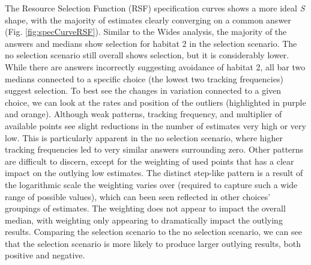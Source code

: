 \documentclass[10pt,a4paper]{article}
\begin{document}
The Resource Selection Function (RSF) specification curves shows a more ideal \emph{S} shape, with the majority of estimates clearly converging on a common answer (Fig. \ref{fig:specCurveRSF}).
Similar to the Wides analysis, the majority of the answers and medians show selection for habitat 2 in the selection scenario.
The no selection scenario still overall shows selection, but it is considerably lower.
While there are answers incorrectly suggesting avoidance of habitat 2, all bar two medians connected to a specific choice (the lowest two tracking frequencies) suggest selection.
To best see the changes in variation connected to a given choice, we can look at the rates and position of the outliers (highlighted in purple and orange).
Although weak patterns, tracking frequency, and multiplier of available points see slight reductions in the number of estimates very high or very low.
This is particularly apparent in the no selection scenario, where higher tracking frequencies led to very similar answers surrounding zero.
Other patterns are difficult to discern, except for the weighting of used points that has a clear impact on the outlying low estimates.
The distinct step-like pattern is a result of the logarithmic scale the weighting varies over (required to capture such a wide range of possible values), which can been seen reflected in other choices' groupings of estimates.
The weighting does not appear to impact the overall median, with weighting only appearing to dramatically impact the outlying results.
Comparing the selection scenario to the no selection scenario, we can see that the selection scenario is more likely to produce larger outlying results, both positive and negative.
\end{document}

